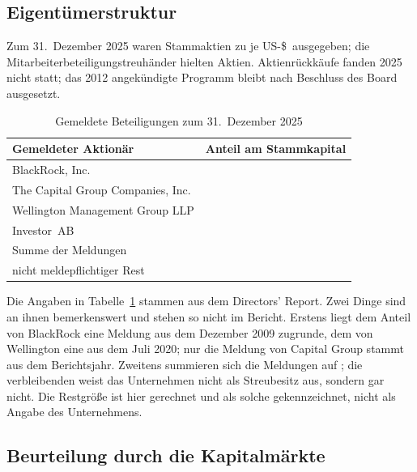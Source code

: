 \subsection{Eigent\"umerstruktur}

Zum 31.~Dezember 2025 waren \Stueck{\AznAktienAusgegeben} Stammaktien zu je
US-\$\,\Kurswert{\AznNennwert} ausgegeben; die Mitarbeiterbeteiligungstreuh\"ander hielten
\Stueck{\AznEigeneAktien} Aktien.
Aktienr\"uckk\"aufe fanden 2025 nicht statt; das 2012 angek\"undigte Programm
bleibt nach Beschluss des Board ausgesetzt.

\begin{table}[htbp]
\centering
\caption{Gemeldete Beteiligungen zum 31.~Dezember 2025}
\label{tab:azn-eigentuemer}
\begin{tabular}{lr}
\toprule
Gemeldeter Aktion\"ar & Anteil am Stammkapital\\
\midrule
BlackRock, Inc.                       & \Pct{\AznBlackRock}\\
The Capital Group Companies, Inc.     & \Pct{\AznCapitalGroup}\\
Wellington Management Group LLP       & \Pct{\AznWellington}\\
Investor~AB                           & \Pct{\AznInvestorAB}\\
\midrule
Summe der Meldungen                   & \Pct{\AznAnteileGemeldet}\\
nicht meldepflichtiger Rest           & \Pct{\AznStreubesitz}\\
\bottomrule
\end{tabular}
\end{table}

Die Angaben in Tabelle~\ref{tab:azn-eigentuemer} stammen aus dem Directors'
Report.
Zwei Dinge sind an ihnen bemerkenswert und stehen so nicht im Bericht. Erstens
liegt dem Anteil von BlackRock eine Meldung aus dem Dezember 2009 zugrunde, dem
von Wellington eine aus dem Juli 2020; nur die Meldung von Capital Group
stammt aus dem Berichtsjahr.
Zweitens summieren sich die Meldungen auf \Pct{\AznAnteileGemeldet}; die
verbleibenden \Pct{\AznStreubesitz} weist das Unternehmen nicht als
Streubesitz aus, sondern gar nicht. Die Restgr\"o{\ss}e ist hier gerechnet und
als solche gekennzeichnet, nicht als Angabe des Unternehmens.

\subsection{Beurteilung durch die Kapitalm\"arkte}

